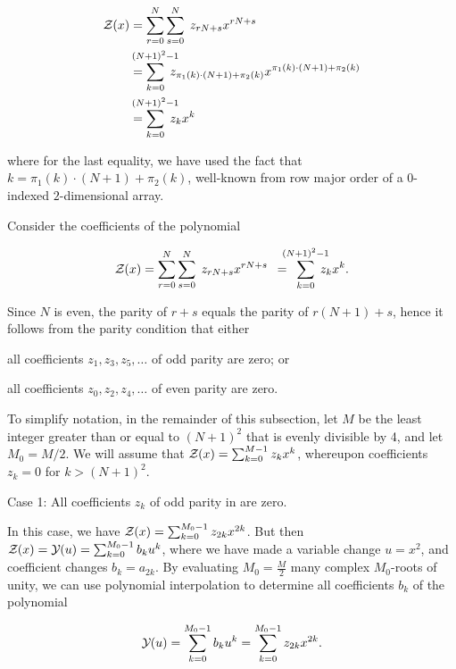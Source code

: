 \begin{align}
\label{eq:ffttwo:polyRecEvenN}
\begin{split}
\fullZx &= \sum_{r=0}^{N} \sum_{s=0}^{N}\; z_{rN+s} x^{rN+s} \\
&=
\sum_{k=0}^{\mathclap{(N+1)^2-1}}\; z_{\pi_1(k)\cdot (N+1) + \pi_2(k)}
x^{\pi_1(k)\cdot (N+1) + \pi_2(k)} \\
&=
\sum_{k=0}^{\mathclap{(N+1)^2-1}}\; z_k x^k
\end{split}
\end{align}

where for the last equality, we have used the fact that
$k = \pi_1(k)\cdot (N+1)+\pi_2(k)$, well-known from
row major order of a $0$-indexed $2$-dimensional array.

Consider the coefficients of the polynomial

\begin{align}
\label{eq:ffttwo:zOfXEvenN}
\fullZx = \sum_{r=0}^{N} \sum_{s=0}^{N}\; z_{rN+s} x^{rN+s}
\enspace=\enspace\sum_{k=0}^{\mathclap{(N+1)^2-1}}\; z_k x^k.
\end{align}

Since $N$ is even, the parity of $r+s$ equals the parity of
$r(N+1)+s$, hence  it follows from the parity condition that either
\begin{inparaenum}[\em 1\upshape)]
\item all coefficients $z_1,z_3,z_5,\dots$ of odd parity are zero;
or \item all coefficients $z_0,z_2,z_4,\dots$ of even parity are zero.
\end{inparaenum}
To simplify notation, in the remainder of this subsection, let $M$ be
the least integer greater than or equal to $(N+1)^2$ that is evenly divisible
by 4, and let $M_0=M/2$. We will assume that ${\mathcal Z}_{}(x) = \sum_{k=0}^{M-1}
z_k x^k$, whereupon coefficients $z_k=0$ for $k>(N+1)^2$.

\medskip
{\sc Case 1}: All coefficients $z_k$ of odd parity in
 are zero.
\smallskip

In this case, we have
${\mathcal Z}_{}(x) = \sum_{k=0}^{M_0-1} z_{2k} x^{2k}$. But then
${\mathcal Z}_{}(x) = {\mathcal Y}_{}(u) = \sum_{k=0}^{M_0-1} b_k u^k$,
where we have made a variable change $u=x^2$, and coefficient changes
$b_k = a_{2k}$.
By evaluating $M_0=\frac{M}{2}$ many complex
$M_0$-roots of unity, we can
use polynomial interpolation to determine all coefficients $b_k$ of
the polynomial

\begin{align}
{\mathcal Y}_{}(u) = \sum_{k=0}^{M_0-1} b_k u^k = \sum_{k=0}^{M_0-1} z_{2k} x^{2k}.
\end{align}

